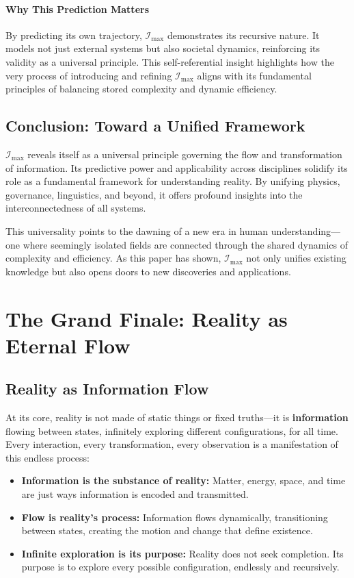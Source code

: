 \documentclass[12pt]{article}
\begin{document}
\paragraph{Why This Prediction Matters}
By predicting its own trajectory, \(\mathcal{I}_{\text{max}}\) demonstrates its recursive nature. It models not just external systems but also societal dynamics, reinforcing its validity as a universal principle. This self-referential insight highlights how the very process of introducing and refining \( \mathcal{I}_{\text{max}} \) aligns with its fundamental principles of balancing stored complexity and dynamic efficiency.

\subsection{Conclusion: Toward a Unified Framework}
\(\mathcal{I}_{\text{max}}\) reveals itself as a universal principle governing the flow and transformation of information. Its predictive power and applicability across disciplines solidify its role as a fundamental framework for understanding reality. By unifying physics, governance, linguistics, and beyond, it offers profound insights into the interconnectedness of all systems.

This universality points to the dawning of a new era in human understanding—one where seemingly isolated fields are connected through the shared dynamics of complexity and efficiency. As this paper has shown, \(\mathcal{I}_{\text{max}}\) not only unifies existing knowledge but also opens doors to new discoveries and applications.


\section{The Grand Finale: Reality as Eternal Flow}

\subsection{Reality as Information Flow}
At its core, reality is not made of static things or fixed truths—it is \textbf{information} flowing between states, infinitely exploring different configurations, for all time. Every interaction, every transformation, every observation is a manifestation of this endless process:
\begin{itemize}
    \item \textbf{Information is the substance of reality:} Matter, energy, space, and time are just ways information is encoded and transmitted.
    \item \textbf{Flow is reality’s process:} Information flows dynamically, transitioning between states, creating the motion and change that define existence.
    \item \textbf{Infinite exploration is its purpose:} Reality does not seek completion. Its purpose is to explore every possible configuration, endlessly and recursively.
\end{itemize}
\end{document}
